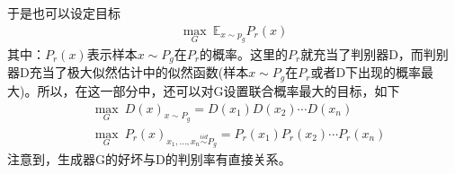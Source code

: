             于是也可以设定目标
            \begin{align*}
            \max_G\ \mathbb{E}_{x\sim p_g}P_r(x)
            \end{align*}
            其中：$P_r(x)$表示样本$x\sim P_g$在$P_r$的概率。这里的$P_r$就充当了判别器D，而判别器D充当了极大似然估计中的似然函数(样本$x\sim P_g$在$P_r$或者D下出现的概率最大)。所以，在这一部分中，还可以对G设置联合概率最大的目标，如下
            \begin{align*}
            &\max_G\ D(x)_{x\sim P_g} = D(x_1)D(x_2)\cdots D(x_n)\\
            &\max_G\ P_r(x)_{x_1,\dots,x_n\overset{iid}{\sim }P_g} = P_r(x_1)P_r(x_2)\cdots P_r(x_n)
            \end{align*}
            注意到，生成器G的好坏与D的判别率有直接关系。
